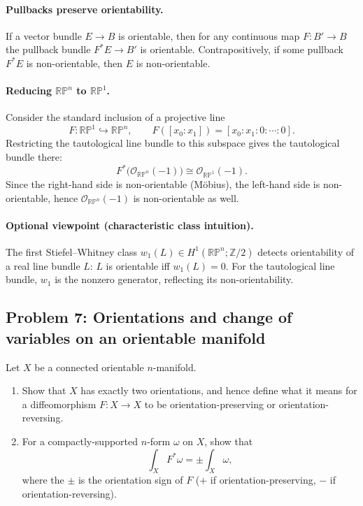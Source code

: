 \documentclass[12pt,a4paper]{article}
\theoremstyle{plain}
\theoremstyle{definition}      %
\begin{document}
	\paragraph{Pullbacks preserve orientability.}
	If a vector bundle $E\to B$ is orientable, then for any continuous map $F:B'\to B$
	the pullback bundle $F^*E\to B'$ is orientable.
	Contrapositively, if some pullback $F^*E$ is non-orientable, then $E$ is non-orientable.
	
	\paragraph{Reducing $\mathbb{RP}^n$ to $\mathbb{RP}^1$.}
	Consider the standard inclusion of a projective line
	\[
	F:\mathbb{RP}^1\hookrightarrow \mathbb{RP}^n,
	\qquad
	F([x_0:x_1])=[x_0:x_1:0:\cdots:0].
	\]
	Restricting the tautological line bundle to this subspace gives the tautological bundle there:
	\[
	F^*\big(\mathcal{O}_{\mathbb{RP}^n}(-1)\big)\cong \mathcal{O}_{\mathbb{RP}^1}(-1).
	\]
	Since the right-hand side is non-orientable (M\"obius), the left-hand side is non-orientable,
	hence $\mathcal{O}_{\mathbb{RP}^n}(-1)$ is non-orientable as well.
	
	\paragraph{Optional viewpoint (characteristic class intuition).}
	The first Stiefel--Whitney class $w_1(L)\in H^1(\mathbb{RP}^n;\mathbb{Z}/2)$ detects orientability of a real line bundle $L$:
	$L$ is orientable iff $w_1(L)=0$.
	For the tautological line bundle, $w_1$ is the nonzero generator, reflecting its non-orientability.
	
	
	\subsection*{Problem 7: Orientations and change of variables on an orientable manifold}
	Let $X$ be a connected orientable $n$-manifold.
	\begin{enumerate}
		\item[(a)] Show that $X$ has exactly two orientations, and hence define what it means for a diffeomorphism
		$F: X \to X$ to be orientation-preserving or orientation-reversing.
		\item[(b)] For a compactly-supported $n$-form $\omega$ on $X$, show that
		\[
		\int_X F^{*}\omega=\pm \int_X \omega,
		\]
		where the $\pm$ is the orientation sign of $F$ ($+$ if orientation-preserving, $-$ if orientation-reversing).
	\end{enumerate}
	
\end{document}
